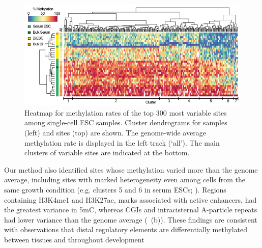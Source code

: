 \begin{figure}[htbp!]
\centering
\includegraphics[width=1.0\textwidth]{top300}
\caption[Heatmap of top 300 most variable sites.]{Heatmap for methylation rates of the top 300 most variable sites among single-cell ESC samples. Cluster dendrograms for samples (left) and sites (top) are shown. The genome-wide average methylation rate is displayed in the left track (`all'). The main clusters of variable sites are indicated at the bottom.}
\label{fig:bs_top300}
\end{figure}

Our method also identified sites whose methylation varied more than the genome average, including sites with marked heterogeneity even among cells from the same growth condition (e.g. clusters 5 and 6 in serum ESCs; ). Regions containing H3K4me1 and H3K27ac, marks associated with active enhancers, had the greatest variance in 5mC, whereas CGIs and intracisternal A-particle repeats had lower variance than the genome average (~(b)). These findings are consistent with observations that distal regulatory elements are differentially methylated between tissues and throughout development~\citep{stadler_dna-binding_2011,ziller_charting_2013,hon_epigenetic_2013}

